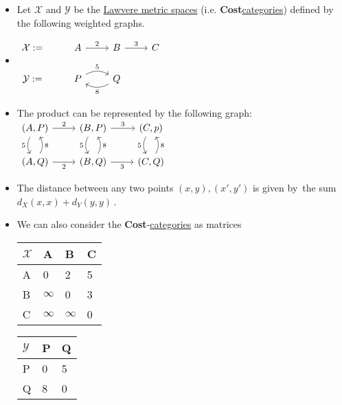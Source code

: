 \begin{itemize}
    \item Let $\mathcal{X}$ and $\mathcal{Y}$ be the \hyperref[D2.53]{Lawvere metric spaces} (i.e. \textbf{Cost}\hyperref[D2.46]{categories}) defined by the following weighted graphs.
    \item $\begin{tikzcd}\mathcal{X}:= & A \arrow[r, "2"]            & B \arrow[r, "3"]            & C \\\mathcal{Y}:= & P \arrow[r, "5", bend left] & Q \arrow[l, "8", bend left] &  \end{tikzcd}$
    \item The product can be represented by the following graph: \,$\begin{tikzcd}{(A,P)} \arrow[r, "2"] \arrow[d, "5"', bend right]  & {(B,P)} \arrow[r, "3"] \arrow[d, "5"', bend right]  & {(C,p)} \arrow[d, "5"', bend right] \\{(A,Q)} \arrow[r, "2"'] \arrow[u, "8"', bend right] & {(B,Q)} \arrow[r, "3"'] \arrow[u, "8"', bend right] & {(C,Q)} \arrow[u, "8"', bend right]\end{tikzcd}$\,
    \item The distance between any two points $(x,y),(x',y')$ is given by \,the sum $d_X(x,x)+d_Y(y,y)$\,.

    \item We can also consider the \textbf{Cost}-\hyperref[D2.46]{categories} as matrices

          \begin{minipage}{0.48\textwidth}
            \begin{tabular}{|l|l|l|l|}
              \hline
              $\mathcal{X}$ & A        & B        & C \\ \hline
              A             & 0        & 2        & 5 \\ \hline
              B             & $\infty$ & 0        & 3 \\ \hline
              C             & $\infty$ & $\infty$ & 0 \\ \hline
            \end{tabular}
          \end{minipage}

          \begin{minipage}{0.48\textwidth}

            \begin{tabular}{|l|l|l|}
              \hline
              $\mathcal{Y}$ & P & Q \\ \hline
              P             & 0 & 5 \\ \hline
              Q             & 8 & 0 \\ \hline
            \end{tabular}
          \end{minipage}


\end{itemize}
